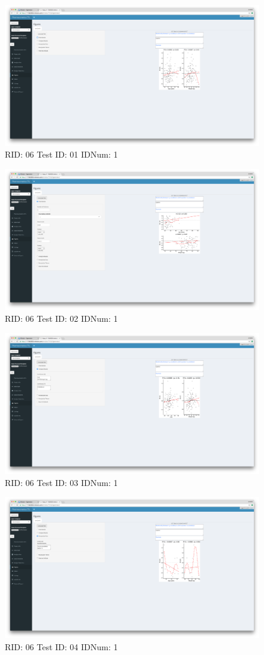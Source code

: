 \begin{figure}[H]
\includegraphics[width=.8\textwidth]{screencaps/06-01-1.png}
\caption{RID: 06 Test ID: 01 IDNum: 1}
\end{figure}
\begin{figure}[H]
\includegraphics[width=.8\textwidth]{screencaps/06-02-1.png}
\caption{RID: 06 Test ID: 02 IDNum: 1}
\end{figure}
\begin{figure}[H]
\includegraphics[width=.8\textwidth]{screencaps/06-03-1.png}
\caption{RID: 06 Test ID: 03 IDNum: 1}
\end{figure}
\begin{figure}[H]
\includegraphics[width=.8\textwidth]{screencaps/06-04-1.png}
\caption{RID: 06 Test ID: 04 IDNum: 1}
\end{figure}
